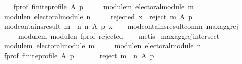\begin{isabellebody}
\ \ \isanewline
\ \ \ \ f{\isacharunderscore}{\kern0pt}prof{\isacharcolon}{\kern0pt}\ {\isachardoublequoteopen}finite{\isacharunderscore}{\kern0pt}profile\ A\ p{\isachardoublequoteclose}\ \isanewline
\ \ \ \ module{\isacharunderscore}{\kern0pt}m{\isacharcolon}{\kern0pt}\ {\isachardoublequoteopen}electoral{\isacharunderscore}{\kern0pt}module\ m{\isachardoublequoteclose}\ \isanewline
\ \ \ \ module{\isacharunderscore}{\kern0pt}n{\isacharcolon}{\kern0pt}\ {\isachardoublequoteopen}electoral{\isacharunderscore}{\kern0pt}module\ n{\isachardoublequoteclose}\ \isanewline
\ \ \ \ rejected{\isacharcolon}{\kern0pt}\ {\isachardoublequoteopen}x\ {\isasymin}\ reject\ m\ A\ p{\isachardoublequoteclose}\isanewline
\ \ \isanewline
\ \ \ \ {\isachardoublequoteopen}mod{\isacharunderscore}{\kern0pt}contains{\isacharunderscore}{\kern0pt}result\ {\isacharparenleft}{\kern0pt}m\ {\isasymparallel}\isactrlsub {\isasymup}\ n{\isacharparenright}{\kern0pt}\ n\ A\ p\ x{\isachardoublequoteclose}\isanewline
%
\isadelimproof
\ \ %
\endisadelimproof
%
\isatagproof
{}\isamarkupfalse%
\ mod{\isacharunderscore}{\kern0pt}contains{\isacharunderscore}{\kern0pt}result{\isacharunderscore}{\kern0pt}comm\ max{\isacharunderscore}{\kern0pt}agg{\isacharunderscore}{\kern0pt}rej{}\isanewline
\ \ \ \ \ \ \ \ module{\isacharunderscore}{\kern0pt}m\ module{\isacharunderscore}{\kern0pt}n\ f{\isacharunderscore}{\kern0pt}prof\ rejected\isanewline
\ \ \isamarkupfalse%
\ metis%
\endisatagproof
{\isafoldproof}%
%
\isadelimproof
\isanewline
%
\endisadelimproof
\isanewline
{}\isamarkupfalse%
\ max{\isacharunderscore}{\kern0pt}agg{\isacharunderscore}{\kern0pt}rej{\isacharunderscore}{\kern0pt}intersect{\isacharcolon}{\kern0pt}\isanewline
\ \ \isanewline
\ \ \ \ module{\isacharunderscore}{\kern0pt}m{\isacharcolon}{\kern0pt}\ {\isachardoublequoteopen}electoral{\isacharunderscore}{\kern0pt}module\ m{\isachardoublequoteclose}\ \isanewline
\ \ \ \ module{\isacharunderscore}{\kern0pt}n{\isacharcolon}{\kern0pt}\ {\isachardoublequoteopen}electoral{\isacharunderscore}{\kern0pt}module\ n{\isachardoublequoteclose}\ \isanewline
\ \ \ \ f{\isacharunderscore}{\kern0pt}prof{\isacharcolon}{\kern0pt}\ {\isachardoublequoteopen}finite{\isacharunderscore}{\kern0pt}profile\ A\ p{\isachardoublequoteclose}\isanewline
\ \ \isanewline
\ \ \ \ {\isachardoublequoteopen}reject\ {\isacharparenleft}{\kern0pt}m\ {\isasymparallel}\isactrlsub {\isasymup}\ n{\isacharparenright}{\kern0pt}\ A\ p\ {\isacharequal}{\kern0pt}\isanewline

\end{isabellebody}
